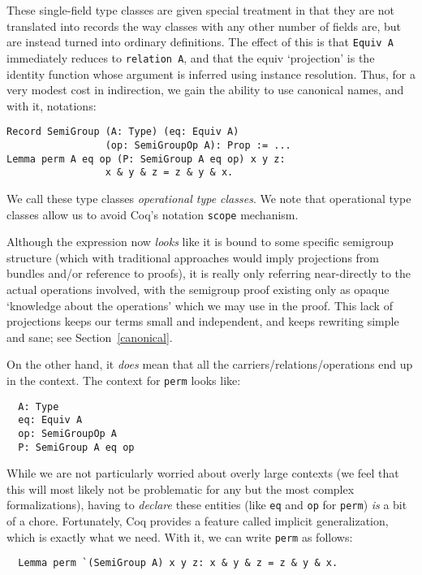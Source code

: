 \documentclass[a4paper,10pt,runningheads]{llncs}
\begin{document}
These single-field type classes are given special treatment in that they are not translated into
records the way classes with any other number of fields are, but are instead turned into ordinary
definitions. The effect of this is that \lstinline|Equiv A| immediately reduces to \lstinline|relation A|, and that the equiv `projection' is the identity function whose argument is inferred using instance resolution. Thus, for a very modest cost in indirection, we gain the ability to use canonical names, and with it, notations:
\begin{lstlisting}
Record SemiGroup (A: Type) (eq: Equiv A)
                 (op: SemiGroupOp A): Prop := ...
Lemma perm A eq op (P: SemiGroup A eq op) x y z:
                 x & y & z = z & y & x.
\end{lstlisting}

We call these type classes \emph{operational type classes}. We note that operational type classes
allow us to avoid Coq's notation \lstinline|scope| mechanism.

Although the expression now \emph{looks} like it is bound to some
specific semigroup structure (which with traditional approaches would imply projections from bundles
and/or reference to proofs), it is really only referring near-directly to the actual operations
involved, with the semigroup proof existing only as opaque `knowledge about the operations' which we
may use in the proof. This lack of projections keeps our terms small and independent, and keeps
rewriting simple and sane; see Section~\ref{canonical}.

On the other hand, it \emph{does} mean that all the carriers/relations/operations end up in the
context. The context for \lstinline|perm| looks like:
\begin{lstlisting}
  A: Type
  eq: Equiv A
  op: SemiGroupOp A
  P: SemiGroup A eq op
\end{lstlisting}


While we are not particularly worried about overly large contexts (we feel that this will most
likely not be problematic for any but the most complex formalizations), having to \emph{declare}
these entities (like \lstinline|eq| and \lstinline|op| for \lstinline|perm|) \emph{is} a bit of a chore. Fortunately, Coq provides a feature called implicit generalization, which is exactly what we need.
With it, we can write \lstinline|perm| as follows:
\begin{lstlisting}
  Lemma perm `(SemiGroup A) x y z: x & y & z = z & y & x.
\end{lstlisting}
\end{document}
